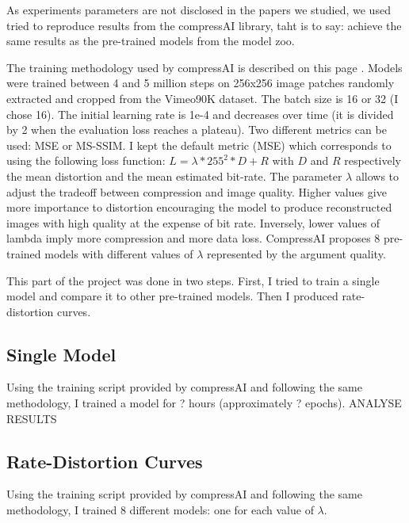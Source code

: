 As experiments parameters are not disclosed in the papers we studied, we used tried to reproduce results from the compressAI library, taht is to say: achieve the same results as the pre-trained models from the model zoo.

The training methodology used by compressAI is described on this page \cite{compressai_train}. Models were trained between 4 and 5 million steps on 256x256 image patches randomly extracted and cropped from the Vimeo90K dataset. The batch size is 16 or 32 (I chose 16). The initial learning rate is 1e-4 and decreases over time (it is divided by 2 when the evaluation loss reaches a plateau). Two different metrics can be used: MSE or MS-SSIM. I kept the default metric (MSE) which corresponds to using the following loss function: \(L = \lambda * 255^{2} * D + R\) with \(D\) and \(R\) respectively the mean distortion and the mean estimated bit-rate. The parameter \(\lambda\) allows to adjust the tradeoff between compression and image quality. Higher values give more importance to distortion encouraging the model to produce reconstructed images with high quality at the expense of bit rate. Inversely, lower values of lambda imply more compression and more data loss. CompressAI proposes 8 pre-trained models with different values of \(\lambda\) represented by the argument \textsf{quality}.

This part of the project was done in two steps. First, I tried to train a single model and compare it to other pre-trained models. Then I produced rate-distortion curves.

\subsection{Single Model}
Using the training script provided by compressAI and following the same methodology, I trained a model for ? hours (approximately ? epochs). ANALYSE RESULTS

\subsection{Rate-Distortion Curves}
Using the training script provided by compressAI and following the same methodology, I trained 8 different models: one for each value of \(\lambda\).
